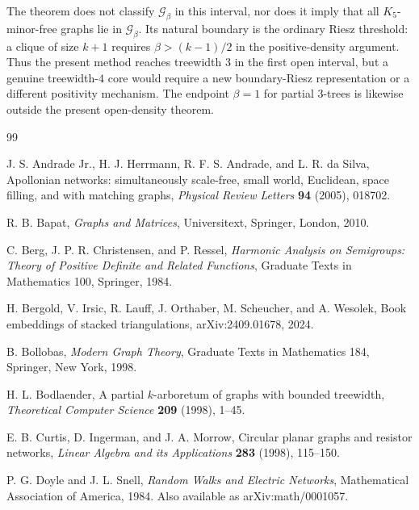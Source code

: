 \documentclass[preprint,12pt,authoryear]{elsarticle}
\numberwithin{equation}{section}
\theoremstyle{definition}
\theoremstyle{remark}
\newcommand{\calG}{\mathcal{G}}
\newcommand{\1}{\mathbf{1}}
\begin{document}
The theorem does not classify \(\calG_\beta\) in this interval, nor does it imply that all \(K_5\)-minor-free graphs lie in \(\calG_\beta\).  Its natural boundary is the ordinary Riesz threshold: a clique of size \(k+1\) requires \(\beta>(k-1)/2\) in the positive-density argument.  Thus the present method reaches treewidth \(3\) in the first open interval, but a genuine treewidth-\(4\) core would require a new boundary-Riesz representation or a different positivity mechanism.  The endpoint \(\beta=1\) for partial \(3\)-trees is likewise outside the present open-density theorem.

\begin{thebibliography}{99}

J. S. Andrade Jr., H. J. Herrmann, R. F. S. Andrade, and L. R. da Silva,
Apollonian networks: simultaneously scale-free, small world, Euclidean, space filling, and with matching graphs,
\emph{Physical Review Letters} \textbf{94} (2005), 018702.

R. B. Bapat,
\emph{Graphs and Matrices},
Universitext, Springer, London, 2010.

C. Berg, J. P. R. Christensen, and P. Ressel,
\emph{Harmonic Analysis on Semigroups: Theory of Positive Definite and Related Functions},
Graduate Texts in Mathematics 100, Springer, 1984.

H. Bergold, V. Irsic, R. Lauff, J. Orthaber, M. Scheucher, and A. Wesolek,
Book embeddings of stacked triangulations,
arXiv:2409.01678, 2024.

B. Bollobas,
\emph{Modern Graph Theory},
Graduate Texts in Mathematics 184, Springer, New York, 1998.

H. L. Bodlaender,
A partial \(k\)-arboretum of graphs with bounded treewidth,
\emph{Theoretical Computer Science} \textbf{209} (1998), 1--45.

E. B. Curtis, D. Ingerman, and J. A. Morrow,
Circular planar graphs and resistor networks,
\emph{Linear Algebra and its Applications} \textbf{283} (1998), 115--150.

P. G. Doyle and J. L. Snell,
\emph{Random Walks and Electric Networks},
Mathematical Association of America, 1984.
Also available as arXiv:math/0001057.


\end{thebibliography}
\end{document}
